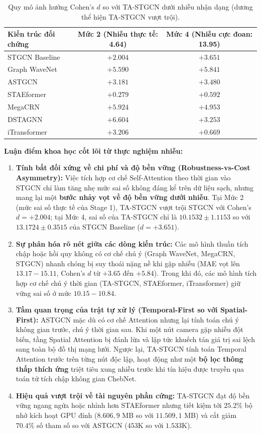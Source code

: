 \begin{table}[htbp]
\centering
\caption{Quy mô ảnh hưởng Cohen's $d$ so với TA-STGCN dưới nhiễu nhận dạng (dương thể hiện TA-STGCN vượt trội).}
\label{tab:cohens_d_chap5}
\small
\begin{tabular}{lcc}
\toprule
\textbf{Kiến trúc đối chứng} & \textbf{Mức 2 (Nhiễu thực tế: 4.64)} & \textbf{Mức 4 (Nhiễu cực đoan: 13.95)} \\
\midrule
STGCN Baseline \cite{stgcn} & $+2.004$ & $+3.651$ \\
Graph WaveNet \cite{wavenet} & $+5.590$ & $+5.841$ \\
ASTGCN \cite{astgcn} & $+3.181$ & $+3.480$ \\
STAEformer \cite{staeformer} & $+0.279$ & $+0.592$ \\
MegaCRN \cite{megacrn} & $+5.924$ & $+4.953$ \\
DSTAGNN \cite{dstagnn} & $+6.604$ & $+3.253$ \\
iTransformer \cite{itransformer} & $+3.206$ & $+0.669$ \\
\bottomrule
\end{tabular}
\end{table}

\textbf{Luận điểm khoa học cốt lõi từ thực nghiệm nhiễu:}
\begin{enumerate}
    \item \textbf{Tính bất đối xứng về chi phí và độ bền vững (Robustness-vs-Cost Asymmetry):} Việc tích hợp cơ chế Self-Attention theo thời gian vào STGCN chỉ làm tăng nhẹ mức sai số không đáng kể trên dữ liệu sạch, nhưng mang lại một \textbf{bước nhảy vọt về độ bền vững dưới nhiễu}. Tại Mức 2 (mức sai số thực tế của Stage 1), TA-STGCN vượt trội STGCN với Cohen's $d = +2.004$; tại Mức 4, sai số của TA-STGCN chỉ là $10.1532 \pm 1.1153$ so với $13.1724 \pm 0.3515$ của STGCN Baseline ($d = +3.651$).
    \item \textbf{Sự phân hóa rõ nét giữa các dòng kiến trúc:} Các mô hình thuần tích chập hoặc hồi quy không có cơ chế chú ý (Graph WaveNet, MegaCRN, STGCN) nhanh chóng bị suy thoái nặng nề khi gặp nhiễu (MAE vọt lên $13.17 - 15.11$, Cohen's $d$ từ $+3.65$ đến $+5.84$). Trong khi đó, các mô hình tích hợp cơ chế chú ý thời gian (TA-STGCN, STAEformer, iTransformer) giữ vững sai số ở mức $10.15 - 10.84$.
    \item \textbf{Tầm quan trọng của trật tự xử lý (Temporal-First so với Spatial-First):} ASTGCN mặc dù có cơ chế Attention nhưng lại tính toán chú ý không gian trước, chú ý thời gian sau. Khi một nút camera gặp nhiễu đột biến, tầng Spatial Attention bị đánh lừa và lập tức khuếch tán giá trị sai lệch sang toàn bộ đồ thị mạng lưới. Ngược lại, TA-STGCN tính toán Temporal Attention trước trên từng nút độc lập, hoạt động như một \textbf{bộ lọc thông thấp thích ứng} triệt tiêu xung nhiễu trước khi tín hiệu được truyền qua toán tử tích chập không gian ChebNet.
    \item \textbf{Hiệu quả vượt trội về tài nguyên phần cứng:} TA-STGCN đạt độ bền vững ngang ngửa hoặc nhỉnh hơn STAEformer nhưng tiết kiệm tới $25.2\%$ bộ nhớ kích hoạt GPU đỉnh ($8.606,9$ MB so với $11.509,1$ MB) và cắt giảm $70.4\%$ số tham số so với ASTGCN ($453\text{K}$ so với $1.533\text{K}$).
\end{enumerate}

